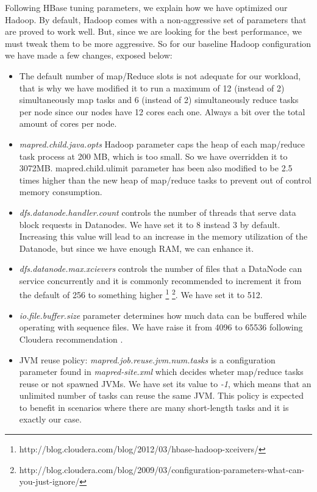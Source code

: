 Following HBase tuning parameters, we explain how we have optimized our Hadoop. By default, Hadoop comes with a non-aggressive set of parameters that are proved to work well. But, since we are looking for the best performance, we must tweak them to be more aggressive. So for our baseline Hadoop configuration we have made a few changes, exposed below: 
\begin{itemize}
\item The default number of map/Reduce slots is not adequate for our workload, that is why we have modified it to run a maximum of 12 (instead of 2) simultaneously map tasks and 6 (instead of 2) simultaneously reduce tasks per node since our nodes have 12 cores each one. Always a bit over the total amount of cores per node.
\item \textit{mapred.child.java.opts} Hadoop parameter caps the heap of each map/reduce task process at 200 MB, which is too small. So we have overridden it to 3072MB. {mapred.child.ulimit} parameter has been also modified to be 2.5 times higher than the new heap of map/reduce tasks to prevent out of control memory consumption.
\item \textit{dfs.datanode.handler.count} controls the number of threads that serve data block requests in Datanodes. We have set it to 8 instead 3 by default. Increasing this value will lead to an increase in the memory utilization of the Datanode, but since we have enough RAM, we can enhance it.
\item \textit{dfs.datanode.max.xcievers} controls the number of files that a DataNode can service concurrently and it is commonly recommended to increment it from the default of 256 to something higher \footnote{http://blog.cloudera.com/blog/2012/03/hbase-hadoop-xceivers/}  \footnote{\label{1}http://blog.cloudera.com/blog/2009/03/configuration-parameters-what-can-you-just-ignore/}. We have set it to 512.
\item \textit{io.file.buffer.size} parameter determines how much data can be buffered while operating with sequence files. We have raise it from 4096 to 65536 following Cloudera recommendation \footnotemark[1].
\item JVM reuse policy: \textit{mapred.job.reuse.jvm.num.tasks} is a configuration parameter found in \textit{mapred-site.xml} which decides wheter map/reduce tasks reuse or not spawned JVMs. We have set its value to \textit{-1}, which means that an unlimited number of tasks can reuse the same JVM. This policy is expected to benefit in scenarios where there are many short-length tasks and it is exactly our case.
\end{itemize}


